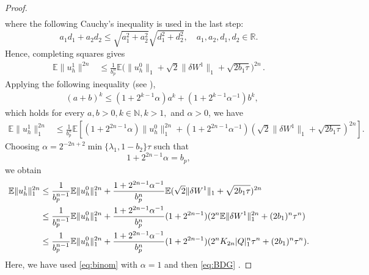 \documentclass[reqno, 11pt]{amsart}
\theoremstyle{plain}
\theoremstyle{definition}
\theoremstyle{remark}
\numberwithin{equation}{section}
\numberwithin{theorem}{section}
\begin{document}
{\begin{proof}
\begin{align}
\end{align}
where the following Cauchy's inequality is used in the last step:
$$
a_1d_1+a_2d_2\leq \sqrt{a_1^2+a_2^2} \sqrt{d_1^2+d_2^2}, \quad a_1, a_2, d_1, d_2\in \mathbb{R}. 
$$
Hence, completing squares gives 
\begin{align}
\mathbb E\|u_h^1\|^{2n}&\leq \frac{1}{b_p^n} \mathbb E\bigg(\|u_h^0\|_1+\sqrt{2}\|\delta W^1\|_1+\sqrt{2b_1\tau}\bigg)^{2n}  \,. 
\end{align}
Applying the following inequality (see \cite[Lemma B.2]{Angeli}), 
\begin{equation}\label{eq:binom}
\begin{aligned}
&(a+b)^k \leq\left(1+2^{k-1} \alpha\right) a^k+\left(1+2^{k-1} \alpha^{-1}\right) b^k,
\end{aligned}
\end{equation}
which holds for every  $a, b>0, k \in \mathbb{N}, k>1,$  and  $\alpha>0$, we have
\begin{align}
\mathbb E\|u_h^1\|^{2n}_1&\leq \frac{1}{b_p^n} \mathbb E \left[(1+2^{2n-1}\alpha)\|u_h^0\|_1^{2n}+(1+2^{2n-1}\alpha^{-1})(\sqrt{2}\|\delta W^1\|_1+\sqrt{2b_1\tau})^{2n}\right].
\end{align}
Choosing $\alpha=2^{-2n+2}\min\{\lambda_1,1-b_2\}\tau$ such that
$$
1+2^{2n-1}\alpha=b_p,
$$
we obtain
\begin{align}
\mathbb E\|u_h^1\|_1^{2n}&\leq \frac{1}{b_p^{n-1}}\mathbb E \|u_h^0\|_1^{2n}+\frac{1+2^{2n-1}\alpha^{-1}}{b_p^n}\mathbb E(\sqrt{2}\|\delta W^1\|_1+\sqrt{2b_1\tau})^{2n}\notag\\
&\leq \frac{1}{b_p^{n-1}}\mathbb E \|u_h^0\|_1^{2n}+\frac{1+2^{2n-1}\alpha^{-1}}{b_p^n}(1+2^{2n-1})(2^n\mathbb E\|\delta W^1\|_1^{2n}+(2b_1)^n\tau^n)\notag\\
&\leq \frac{1}{b_p^{n-1}}\mathbb E \|u_h^0\|_1^{2n}+\frac{1+2^{2n-1}\alpha^{-1}}{b_p^n}(1+2^{2n-1})(2^n K_{2n}|Q|_1^n\tau^n+(2b_1)^n\tau^n).
\end{align}
Here, we have used \eqref{eq:binom} with $\alpha=1$ and then \eqref{eq:BDG} .  

\end{proof}}
\end{document}
